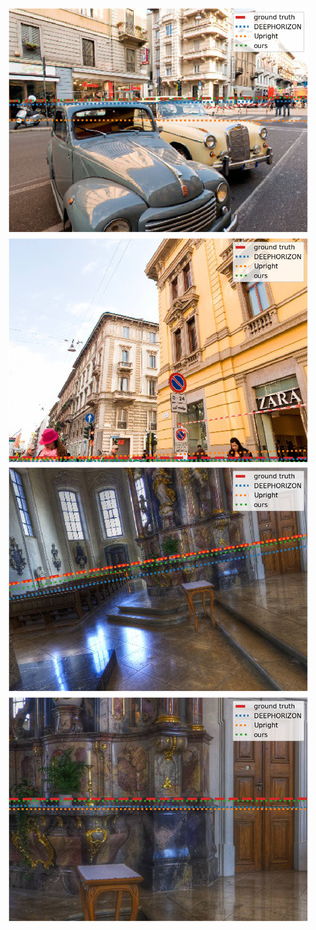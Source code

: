 \includegraphics{horizon_estimation/thumb/pano_addiwhphxpexcd-5.jpg}
\includegraphics{horizon_estimation/thumb/pano_addiwhphxpexcd-6.jpg}
\includegraphics{horizon_estimation/thumb/pano_addiyhtujpaovr-0.jpg}
\includegraphics{horizon_estimation/thumb/pano_addiyhtujpaovr-3.jpg}

